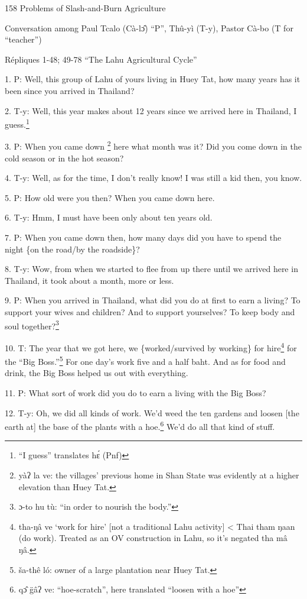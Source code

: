 
158 Problems of Slash-and-Burn Agriculture

Conversation among Paul Tcalo (Cà-lɔ̂) ``P'', Thû-yì (T-y), Pastor Cà-bo
(T for ``teacher'')

Répliques 1-48; 49-78 ``The Lahu Agricultural Cycle''

1. P: Well, this group of Lahu of yours living in Huey Tat, how many years has
it been since you arrived in Thailand?

2. T-y: Well, this year makes about 12 years since we arrived here in Thailand,
I guess.\footnote{``I guess'' translates hɛ́ (Pnf)}

3. P: When you came down \footnote{yàʔ la ve: the villages' previous home in Shan State was evidently at a higher elevation than Huey Tat.} here what month was it? Did you come down in the cold
season or in the hot season?

4. T-y: Well, as for the time, I don't really know! I was still a kid then, you
know.

5. P: How old were you then? When you came down here.

6. T-y: Hmm, I must have been only about ten years old.

7. P: When you came down then, how many days did you have to spend the night \{on
the road/by the roadside\}?

8. T-y: Wow, from when we started to flee from up there until we arrived here in
Thailand, it took about a month, more or less.

9. P: When you arrived in Thailand, what did you do at first to earn a living?
To support your wives and children? And to support yourselves? To keep body and
soul together?\footnote{ɔ-to hu tù: ``in order to nourish the body.''}

10. T: The year that we got here, we \{worked/survived by working\} for hire\footnote{tha-ŋâ ve `work for hire' [not a traditional Lahu activity] < Thai tham ŋaan (do work). Treated as an OV construction in Lahu, so it's negated tha mâ ŋâ.}
for the ``Big Boss.''\footnote{ša-thê ló: owner of a large plantation near Huey Tat.} For one day's work five and a half baht. And as for food
and drink, the Big Boss helped us out with everything.

11. P: What sort of work did you do to earn a living with the Big Boss?

12. T-y: Oh, we did all kinds of work. We'd weed the ten gardens and loosen [the
earth at] the base of the plants with a hoe.\footnote{qɔ̂ g̈âʔ ve: ``hoe-scratch'', here translated ``loosen with a hoe''} We'd do all that kind of stuff.

